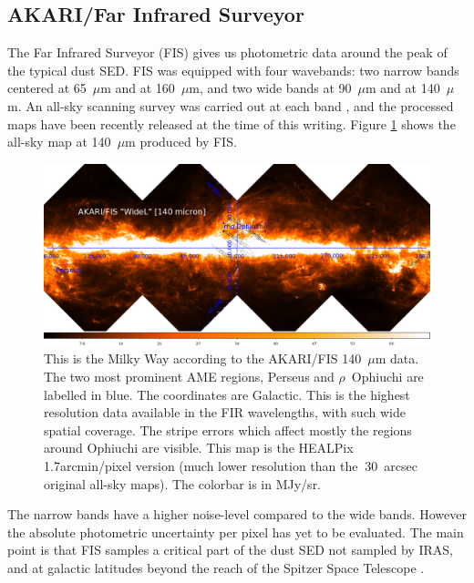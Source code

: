 \subsection{AKARI/Far Infrared Surveyor}
     The Far Infrared Surveyor (FIS) gives us photometric data around the peak of the typical dust SED. FIS was equipped with four wavebands: two narrow bands centered at 65~$\mu$m and at 160~$\mu$m, and two wide bands at 90~$\mu$m and at 140~$\mu$m. An all-sky scanning survey was carried out at each band \citep{doi12}, and the processed maps have been recently released at the time of this writing. Figure \ref{fig:FIS} shows the all-sky map at 140~$\mu$m produced by FIS.
\begin{figure}[!htb]
\begin{center}
\includegraphics[width=170mm]{EPS/im_akari140.pdf}
\caption{This is the Milky Way according to the AKARI/FIS 140~$\mu$m data. The two most prominent AME regions, Perseus and $\rho$~Ophiuchi are labelled in blue. The coordinates are Galactic. This is the highest resolution data available in the FIR wavelengths, with such wide spatial coverage. The stripe errors which affect mostly the regions around Ophiuchi are visible. This map is the HEALPix 1.7arcmin/pixel version (much lower resolution than the $~$30~arcsec original all-sky maps). The colorbar is in MJy/sr.}
\label{fig:FIS}
\end{center}
\end{figure}



The narrow bands have a higher noise-level compared to the wide bands. However the absolute photometric uncertainty per pixel has yet to be evaluated. The main point is that FIS samples a critical part of the dust SED not sampled by IRAS, and at galactic latitudes beyond the reach of the Spitzer Space Telescope \citep{spitzer04}.

